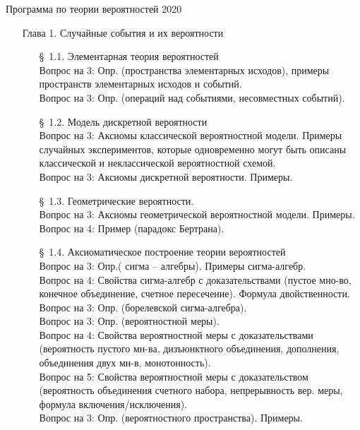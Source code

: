 \documentclass[10pt]{amsart}
\begin{document}
\thispagestyle{empty}

\begin{center}
    {\Large Программа по теории вероятностей 2020}
\end{center}


\begin{enumerate}
\item[Глава 1.] Случайные события и их вероятности \\
\begin{enumerate}
\item[\S\, 1.1.] Элементарная теория вероятностей \\
Вопрос на 3: Опр. (пространства элементарных исходов), примеры пространств элементарных исходов и событий. \\
Вопрос на 3: Опр. (операций над событиями, несовместных событий). \\
\item[\S\, 1.2.] Модель дискретной вероятности \\
Вопрос на 3: Аксиомы классической вероятностной модели. Примеры случайных экспериментов, которые одновременно могут быть описаны классической и неклассической вероятностной схемой. \\
Вопрос на 3: Аксиомы дискретной вероятности. Примеры. \\
\item[\S\, 1.3.] Геометрические вероятности. \\
Вопрос на 3: Аксиомы геометрической вероятностной модели. Примеры. \\
Вопрос на 4: Пример (парадокс Бертрана). \\ 

\item[\S\, 1.4.] Аксиоматическое построение теории вероятностей \\ 
Вопрос на 3: Опр.( сигма – алгебры). Примеры сигма-алгебр. \\
Вопрос на 4: Свойства сигма-алгебр с доказательствами (пустое мно-во, конечное объединение, счетное пересечение). Формула двойственности. \\
Вопрос на 3: Опр. (борелевской сигма-алгебра). \\
Вопрос на 3: Опр. (вероятностной меры). \\
Вопрос на 4: Свойства вероятностной меры с доказательствами (вероятность пустого мн-ва, дизъюнктного объединения, дополнения, объединения двух мн-в, монотонность). \\
Вопрос на 5: Свойства  вероятностной меры с доказательством (вероятность объединения счетного набора, непрерывность вер. меры, формула включения/исключения). \\
Вопрос на 3: Опр. (вероятностного пространства). Примеры. \\


\end{enumerate}
\end{enumerate}
\end{document}
